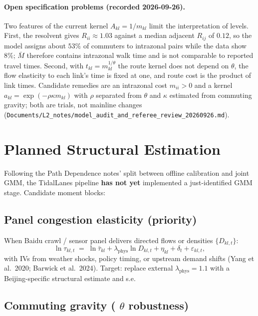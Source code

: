 \documentclass[11pt]{article}
\newcommand{\phys}{\mathrm{phys}}
\begin{document}
\paragraph{Open specification problems (recorded 2026-09-26).}
Two features of the current kernel $A_{kl}=1/m_{kl}$ limit the
interpretation of levels. First, the resolvent gives $R_{ii}\approx 1.03$
against a median adjacent $R_{ij}$ of $0.12$, so the model assigns about
$53\%$ of commuters to intrazonal pairs while the data show $8\%$; $\bar M$
therefore contains intrazonal walk time and is not comparable to reported
travel times. Second, with $t_{kl}=m_{kl}^{1/\theta}$ the route kernel does
not depend on $\theta$, the flow elasticity to each link's time is fixed at
one, and route cost is the product of link times. Candidate remedies are an
intrazonal cost $m_{ii}>0$ and a kernel $a_{kl}=\exp(-\rho\kappa m_{kl})$
with $\rho$ separated from $\theta$ and $\kappa$ estimated from commuting
gravity; both are trials, not mainline changes
(\texttt{Documents/L2\_notes/model\_audit\_and\_referee\_review\_20260926.md}).

\section{Planned Structural Estimation}\label{sec:planned}

Following the Path Dependence notes' split between offline calibration
and joint GMM, the TidalLanes pipeline \textbf{has not yet} implemented
a just-identified GMM stage.  Candidate moment blocks:

\subsection{Panel congestion elasticity (priority)}

When Baidu crawl / sensor panel delivers directed flows or densities
$\{D_{kl,t}\}$:
\begin{equation}
  \ln \tau_{kl,t}
  \;=\;
  \ln\bar\tau_{kl}
  + \lambda_{\phys}\ln D_{kl,t}
  + \eta_{kl} + \delta_t + \varepsilon_{kl,t},
\end{equation}
with IVs from weather shocks, policy timing, or upstream demand shifts
(Yang et al.\ 2020; Barwick et al.\ 2024).  Target: replace external
$\lambda_{\phys}=1.1$ with a Beijing-specific structural estimate and
s.e.

\subsection{Commuting gravity ( $\theta$ robustness)}
\end{document}
